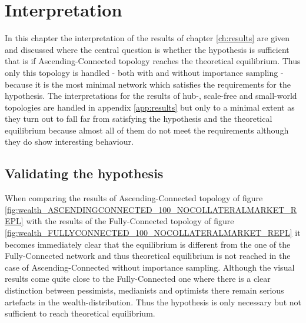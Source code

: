 \documentclass[Bachelorarbeit.tex]{subfiles}
\begin{document}
\graphicspath{{./figures/interpretation/}}	%

\chapter{Interpretation}
\label{ch:interpretation}

In this chapter the interpretation of the results of chapter \ref{ch:results} are given and discussed where the central question is whether the hypothesis is sufficient that is if Ascending-Connected topology reaches the theoretical equilibrium. Thus only this topology is handled - both with and without importance sampling - because it is the most minimal network which satisfies the requirements for the hypothesis. The interpretations for the results of hub-, scale-free and small-world topologies are handled in appendix \ref{app:results} but only to a minimal extent as they turn out to fall far from satisfying the hypothesis and the theoretical equilibrium because almost all of them do not meet the requirements although they do show interesting behaviour.

\section{Validating the hypothesis}
When comparing the results of Ascending-Connected topology of figure \ref{fig:wealth_ASCENDINGCONNECTED_100_NOCOLLATERALMARKET_REPL} with the results of the Fully-Connected topology of figure \ref{fig:wealth_FULLYCONNECTED_100_NOCOLLATERALMARKET_REPL} it becomes immediately clear that the equilibrium is different from the one of the Fully-Connected network and thus theoretical equilibrium is not reached in the case of Ascending-Connected without importance sampling. Although the visual results come quite close to the Fully-Connected one where there is a clear distinction between pessimists, medianists and optimists there remain serious artefacts in the wealth-distribution. Thus the hypothesis is only necessary but not sufficient to reach theoretical equilibrium. 
\end{document}
